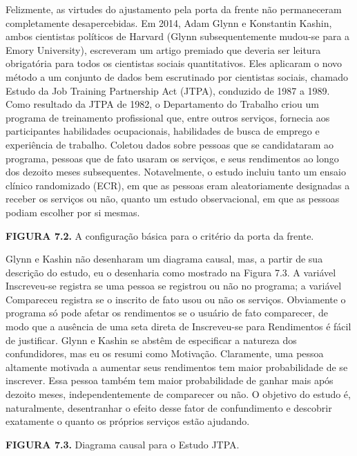 \documentclass[11pt,a5paper,twoside]{book}
\begin{document}
Felizmente, as virtudes do ajustamento pela porta da frente não permaneceram completamente desapercebidas. Em 2014, Adam Glynn e Konstantin Kashin, ambos cientistas políticos de Harvard (Glynn subsequentemente mudou-se para a Emory University), escreveram um artigo premiado que deveria ser leitura obrigatória para todos os cientistas sociais quantitativos. Eles aplicaram o novo método a um conjunto de dados bem escrutinado por cientistas sociais, chamado Estudo da Job Training Partnership Act (JTPA), conduzido de 1987 a 1989. Como resultado da JTPA de 1982, o Departamento do Trabalho criou um programa de treinamento profissional que, entre outros serviços, fornecia aos participantes habilidades ocupacionais, habilidades de busca de emprego e experiência de trabalho. Coletou dados sobre pessoas que se candidataram ao programa, pessoas que de fato usaram os serviços, e seus rendimentos ao longo dos dezoito meses subsequentes. Notavelmente, o estudo incluiu tanto um ensaio clínico randomizado (ECR), em que as pessoas eram aleatoriamente designadas a receber os serviços ou não, quanto um estudo observacional, em que as pessoas podiam escolher por si mesmas.

\textbf{FIGURA 7.2.} A configuração básica para o critério da porta da frente.

Glynn e Kashin não desenharam um diagrama causal, mas, a partir de sua descrição do estudo, eu o desenharia como mostrado na Figura 7.3. A variável Inscreveu-se registra se uma pessoa se registrou ou não no programa; a variável Compareceu registra se o inscrito de fato usou ou não os serviços. Obviamente o programa só pode afetar os rendimentos se o usuário de fato comparecer, de modo que a ausência de uma seta direta de Inscreveu-se para Rendimentos é fácil de justificar. Glynn e Kashin se abstêm de especificar a natureza dos confundidores, mas eu os resumi como Motivação. Claramente, uma pessoa altamente motivada a aumentar seus rendimentos tem maior probabilidade de se inscrever. Essa pessoa também tem maior probabilidade de ganhar mais após dezoito meses, independentemente de comparecer ou não. O objetivo do estudo é, naturalmente, desentranhar o efeito desse fator de confundimento e descobrir exatamente o quanto os próprios serviços estão ajudando.

\textbf{FIGURA 7.3.} Diagrama causal para o Estudo JTPA.
\end{document}
